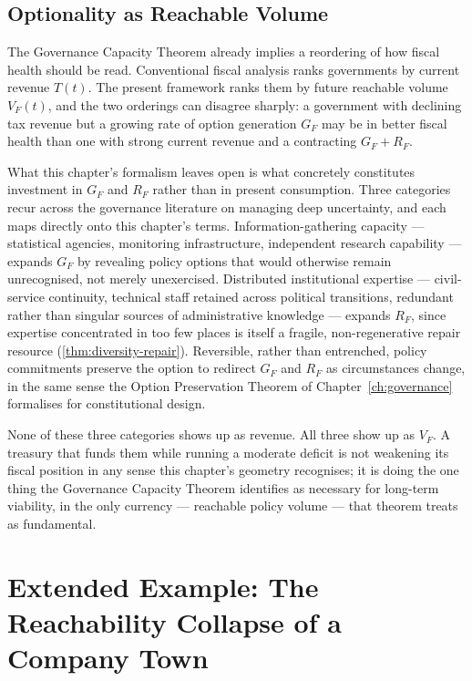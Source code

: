 \documentclass[12pt,twoside,openright]{book}
\newcounter{exercise}[chapter]
\begin{document}
\subsection{Optionality as Reachable Volume}
\label{sec:ch27-optionality}

The Governance Capacity Theorem already implies a reordering
of how fiscal health should be read. Conventional fiscal
analysis ranks governments by current revenue $T(t)$.
The present framework ranks them by future reachable volume
$V_F(t)$, and the two orderings can disagree sharply: a
government with declining tax revenue but a growing rate of
option generation $G_F$ may be in better fiscal health than
one with strong current revenue and a contracting $G_F + R_F$.

What this chapter's formalism leaves open is what concretely
constitutes investment in $G_F$ and $R_F$ rather than in
present consumption. Three categories recur across the
governance literature on managing deep uncertainty, and each
maps directly onto this chapter's terms. Information-gathering
capacity --- statistical agencies, monitoring infrastructure,
independent research capability --- expands $G_F$ by revealing
policy options that would otherwise remain unrecognised, not
merely unexercised. Distributed institutional expertise ---
civil-service continuity, technical staff retained across
political transitions, redundant rather than singular sources
of administrative knowledge --- expands $R_F$, since expertise
concentrated in too few places is itself a fragile,
non-regenerative repair resource (\cref{thm:diversity-repair}).
Reversible, rather than entrenched, policy commitments
preserve the option to redirect $G_F$ and $R_F$ as
circumstances change, in the same sense the Option Preservation
Theorem of Chapter~\ref{ch:governance} formalises for
constitutional design.

None of these three categories shows up as revenue. All three
show up as $V_F$. A treasury that funds them while running a
moderate deficit is not weakening its fiscal position in any
sense this chapter's geometry recognises; it is doing the one
thing the Governance Capacity Theorem identifies as necessary
for long-term viability, in the only currency --- reachable
policy volume --- that theorem treats as fundamental.

\section{Extended Example: The Reachability Collapse of a Company Town}
\label{sec:ch27-company-town}
\end{document}
